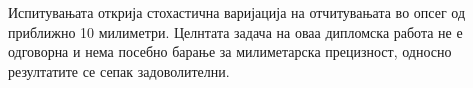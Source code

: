\documentclass[11pt]{article}
\begin{document}
    Испитувањата открија стохастична варијација на отчитувањата во опсег од приближно 10 милиметри. Целнтата задача на оваа дипломска работа не е одговорна и нема посебно барање за милиметарска прецизност, односно резултатите се сепак задоволителни.

\newpage

\end{document}

